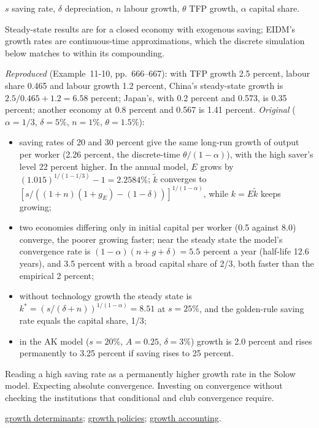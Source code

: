 \begin{qfmodel}
 $s$ saving rate, $\delta$ depreciation, $n$ labour growth, $\theta$ TFP growth, $\alpha$ capital share.

 Steady-state results are for a closed economy with exogenous saving; EIDM's growth rates are continuous-time approximations, which the discrete simulation below matches to within its compounding.

 \emph{Reproduced} (Example~11-10, pp.~666--667): with TFP growth 2.5 percent, labour share 0.465 and labour growth 1.2 percent, China's steady-state growth is $2.5/0.465+1.2=6.58$ percent; Japan's, with 0.2 percent and 0.573, is 0.35 percent; another economy at 0.8 percent and 0.567 is 1.41 percent. \emph{Original} ($\alpha=1/3$, $\delta=5\%$, $n=1\%$, $\theta=1.5\%$):
\begin{itemize}
\item saving rates of 20 and 30 percent give the same long-run growth of output per worker (2.26 percent, the discrete-time $\theta/(1-\alpha)$), with the high saver's level 22 percent higher. In the annual model, $E$ grows by $(1.015)^{1/(1-1/3)}-1=2.2584\%$; $\tilde k$ converges to $[s/((1+n)(1+g_E)-(1-\delta))]^{1/(1-\alpha)}$, while $k=E\tilde k$ keeps growing;
\item two economies differing only in initial capital per worker (0.5 against 8.0) converge, the poorer growing faster; near the steady state the model's convergence rate is $(1-\alpha)(n+g+\delta)=5.5$ percent a year (half-life 12.6 years), and 3.5 percent with a broad capital share of 2/3, both faster than the empirical 2 percent;
\item without technology growth the steady state is $k^*=(s/(\delta+n))^{1/(1-\alpha)}=8.51$ at $s=25\%$, and the golden-rule saving rate equals the capital share, 1/3;
\item in the AK model ($s=20\%$, $A=0.25$, $\delta=3\%$) growth is 2.0 percent and rises permanently to 3.25 percent if saving rises to 25 percent.
\end{itemize}

 Reading a high saving rate as a permanently higher growth rate in the Solow model. Expecting absolute convergence. Investing on convergence without checking the institutions that conditional and club convergence require.

 \hyperref[def:growth-determinants-factors]{growth determinants}; \hyperref[def:growth-policies-technology-trade]{growth policies}; \hyperref[meth:potential-gdp-growth-accounting]{growth accounting}.

\end{qfmodel}

